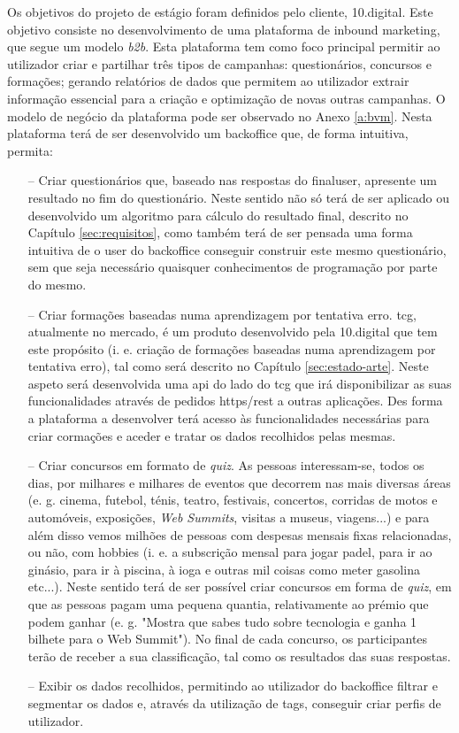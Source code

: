 Os objetivos do projeto de estágio foram definidos pelo cliente, 10.digital. Este objetivo consiste no desenvolvimento de uma plataforma de inbound marketing, que segue um modelo \textit{\gls{b2b}}. Esta plataforma tem como foco principal permitir ao utilizador criar e partilhar três tipos de campanhas: questionários, concursos e formações; gerando relatórios de dados que permitem ao utilizador extrair informação essencial para a criação e optimização de novas outras campanhas. O modelo de negócio da plataforma pode ser observado no Anexo \ref{a:bvm}. Nesta plataforma terá de ser desenvolvido um \gls{backoffice} que, de forma intuitiva, permita:
\begin{itemize}
	\item[--] Criar questionários que, baseado nas respostas do \gls{finaluser}, apresente um resultado no fim do questionário. Neste sentido não só terá de ser aplicado ou desenvolvido um algoritmo para cálculo do resultado final, descrito no Capítulo \ref{sec:requisitos}, como também terá de ser pensada uma forma intuitiva de o \gls{user} do \gls{backoffice} conseguir construir este mesmo questionário, sem que seja necessário quaisquer conhecimentos de programação por parte do mesmo.
	\item[--] Criar formações baseadas numa aprendizagem por tentativa erro. \acrfull{tcg}\cite{tcg}, atualmente no mercado, é um produto desenvolvido pela 10.digital que tem este propósito (i. e. criação de formações baseadas numa aprendizagem por tentativa erro), tal como será descrito no Capítulo \ref{sec:estado-arte}. Neste aspeto será desenvolvida uma \acrshort{api} do lado do \acrshort{tcg} que irá disponibilizar as suas funcionalidades através de pedidos \acrshort{https}/\acrshort{rest} a outras aplicações. Des forma a plataforma a desenvolver terá acesso às funcionalidades necessárias para criar cormações e aceder e tratar os dados recolhidos pelas mesmas.	
	\item[--] Criar concursos em formato de \textit{quiz}. As pessoas interessam-se, todos os dias, por milhares e milhares de eventos que decorrem nas mais diversas áreas (e. g. 	cinema, futebol, ténis, teatro, festivais, concertos, corridas de motos e automóveis, exposições, \textit{Web Summits}\cite{websummit}, visitas a museus, viagens...) e para além disso
	vemos milhões de pessoas com despesas mensais fixas relacionadas, ou não, com hobbies (i. e. a subscrição mensal para jogar padel, para ir ao ginásio, para ir à piscina, à ioga e outras mil coisas como meter gasolina etc...). Neste sentido terá de ser possível criar concursos em forma de \textit{quiz}, em que as pessoas pagam uma pequena quantia, relativamente ao prémio que podem ganhar (e. g. "Mostra que sabes tudo sobre tecnologia e ganha 1 bilhete para o Web Summit"). No final de cada concurso, os participantes terão de receber a sua classificação, tal como os resultados das suas respostas.
	\item[--] Exibir os dados recolhidos, permitindo ao utilizador do \gls{backoffice} filtrar e segmentar os dados e, através da utilização de \gls{tags}, conseguir criar perfis de utilizador.
\end{itemize}



